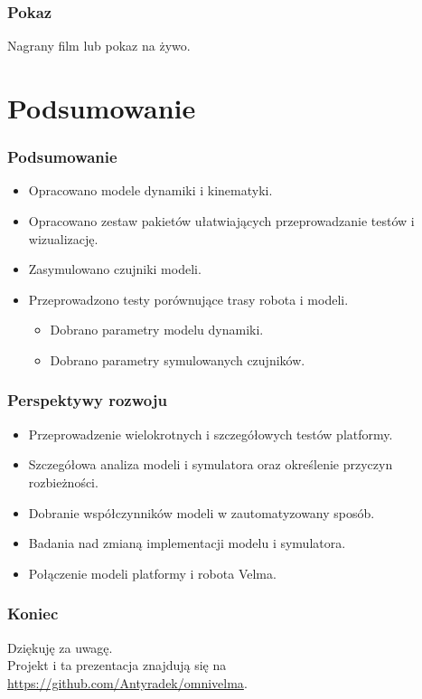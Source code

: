 \documentclass{beamer}
\begin{document}
	
	\begin{frame}
		\frametitle{Pokaz}
		Nagrany film lub pokaz na żywo.
	\end{frame}
 
 
 
	\section{Podsumowanie}
	\begin{frame}
		\frametitle{Podsumowanie}
		\begin{itemize}
			\item Opracowano modele dynamiki i kinematyki.
			\item Opracowano zestaw pakietów ułatwiających przeprowadzanie testów i wizualizację.
			\item Zasymulowano czujniki modeli.
			\item Przeprowadzono testy porównujące trasy robota i modeli.
			\begin{itemize}
				\item Dobrano parametry modelu dynamiki.
				\item Dobrano parametry symulowanych czujników.
			\end{itemize}
		\end{itemize}
	\end{frame}
	\begin{frame}
		\frametitle{Perspektywy rozwoju}
		\begin{itemize}
			\item Przeprowadzenie wielokrotnych i szczegółowych testów platformy.
			\item Szczegółowa analiza modeli i symulatora oraz określenie przyczyn rozbieżności.
			\item Dobranie współczynników modeli w zautomatyzowany sposób.
			\item Badania nad zmianą implementacji modelu i symulatora.
			\item Połączenie modeli platformy i robota Velma.
		\end{itemize}
	\end{frame}
	\begin{frame}
		\frametitle{Koniec}
		\centering
		Dziękuję za uwagę.\\
		Projekt i ta prezentacja znajdują się na \url{https://github.com/Antyradek/omnivelma}.
	\end{frame}
\end{document}
